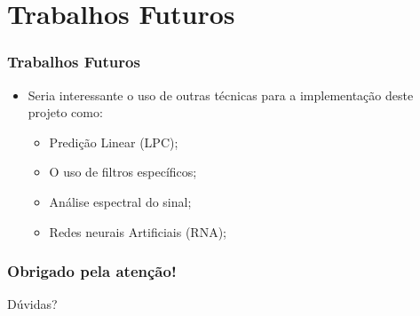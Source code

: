 \documentclass{beamer}
\begin{document}
    \section{Trabalhos Futuros}
    \begin{frame}
    \frametitle{Trabalhos Futuros}
      \begin{itemize}
	    \item Seria interessante o uso de outras técnicas para a implementação
    deste projeto como:
	    \begin{itemize}
		  \item Predição Linear (LPC);
		  \item O uso de filtros específicos;
		  \item Análise espectral do sinal;
		  \item Redes neurais Artificiais (RNA);
    \end{itemize}
    \end{itemize}
    \end{frame}

    \begin{frame}

      \frametitle{Obrigado pela atenção!}
      
      \begin{center}
      
    {\huge Dúvidas? } 

      \end{center} 
    
    \end{frame}

    
\end{document}
